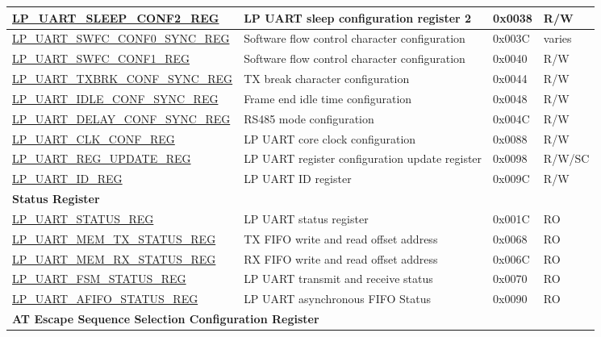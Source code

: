 \begin{longtable}{ | p{6.6cm} | p{6.5cm} | p{1.3cm} | p{1.6cm} | }
\hyperref[regdesc:LPUARTSLEEPCONF2REG]{LP\_UART\_SLEEP\_CONF2\_REG} & LP UART sleep configuration register 2 & 0x0038 & R/W \\ \hline
\hyperref[regdesc:LPUARTSWFCCONF0SYNCREG]{LP\_UART\_SWFC\_CONF0\_SYNC\_REG} & Software flow control character configuration & 0x003C & varies \\ \hline
\hyperref[regdesc:LPUARTSWFCCONF1REG]{LP\_UART\_SWFC\_CONF1\_REG} & Software flow control character configuration & 0x0040 & R/W \\ \hline
\hyperref[regdesc:LPUARTTXBRKCONFSYNCREG]{LP\_UART\_TXBRK\_CONF\_SYNC\_REG} & TX break character configuration & 0x0044 & R/W \\ \hline
\hyperref[regdesc:LPUARTIDLECONFSYNCREG]{LP\_UART\_IDLE\_CONF\_SYNC\_REG} & Frame end idle time configuration & 0x0048 & R/W \\ \hline
\hyperref[regdesc:LPUARTDELAYCONFSYNCREG]{LP\_UART\_DELAY\_CONF\_SYNC\_REG} & RS485 mode configuration & 0x004C & R/W \\ \hline
\hyperref[regdesc:LPUARTCLKCONFREG]{LP\_UART\_CLK\_CONF\_REG} & LP UART core clock configuration & 0x0088 & R/W \\ \hline
\hyperref[regdesc:LPUARTREGUPDATEREG]{LP\_UART\_REG\_UPDATE\_REG} & LP UART register configuration update register & 0x0098 & R/W/SC \\ \hline
\hyperref[regdesc:LPUARTIDREG]{LP\_UART\_ID\_REG} & LP UART ID register & 0x009C & R/W \\ \hline
\multicolumn{4}{|l|}{\textbf{Status Register}} \\ \hline
\hyperref[regdesc:LPUARTSTATUSREG]{LP\_UART\_STATUS\_REG} & LP UART status register & 0x001C & RO \\ \hline
\hyperref[regdesc:LPUARTMEMTXSTATUSREG]{LP\_UART\_MEM\_TX\_STATUS\_REG} & TX FIFO write and read offset address & 0x0068 & RO \\ \hline
\hyperref[regdesc:LPUARTMEMRXSTATUSREG]{LP\_UART\_MEM\_RX\_STATUS\_REG} & RX FIFO write and read offset address & 0x006C & RO \\ \hline
\hyperref[regdesc:LPUARTFSMSTATUSREG]{LP\_UART\_FSM\_STATUS\_REG} & LP UART transmit and receive status & 0x0070 & RO \\ \hline
\hyperref[regdesc:LPUARTAFIFOSTATUSREG]{LP\_UART\_AFIFO\_STATUS\_REG} & LP UART asynchronous FIFO Status & 0x0090 & RO \\ \hline
\multicolumn{4}{|l|}{\textbf{AT Escape Sequence Selection Configuration Register}} \\ \hline

\end{longtable}
